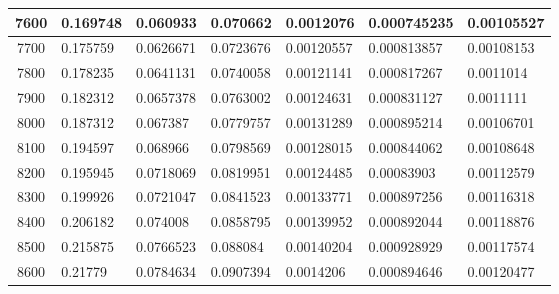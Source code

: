 \documentclass[11pt,spanish]{article} %
\begin{document}
\begin{center}
\begin{longtable}{|c|l|l|l|l|l|l|}
7600 & 0.169748                     & 0.060933                       & 0.070662                       & 0.0012076                      & 0.000745235                    & 0.00105527                    \\ \hline
7700 & 0.175759                     & 0.0626671                      & 0.0723676                      & 0.00120557                     & 0.000813857                    & 0.00108153                    \\ \hline
7800 & 0.178235                     & 0.0641131                      & 0.0740058                      & 0.00121141                     & 0.000817267                    & 0.0011014                     \\ \hline
7900 & 0.182312                     & 0.0657378                      & 0.0763002                      & 0.00124631                     & 0.000831127                    & 0.0011111                     \\ \hline
8000 & 0.187312                     & 0.067387                       & 0.0779757                      & 0.00131289                     & 0.000895214                    & 0.00106701                    \\ \hline
8100 & 0.194597                     & 0.068966                       & 0.0798569                      & 0.00128015                     & 0.000844062                    & 0.00108648                    \\ \hline
8200 & 0.195945                     & 0.0718069                      & 0.0819951                      & 0.00124485                     & 0.00083903                     & 0.00112579                    \\ \hline
8300 & 0.199926                     & 0.0721047                      & 0.0841523                      & 0.00133771                     & 0.000897256                    & 0.00116318                    \\ \hline
8400 & 0.206182                     & 0.074008                       & 0.0858795                      & 0.00139952                     & 0.000892044                    & 0.00118876                    \\ \hline
8500 & 0.215875                     & 0.0766523                      & 0.088084                       & 0.00140204                     & 0.000928929                    & 0.00117574                    \\ \hline
8600 & 0.21779                      & 0.0784634                      & 0.0907394                      & 0.0014206                      & 0.000894646                    & 0.00120477                    \\ \hline

\end{longtable}
\end{center}
\end{document}
